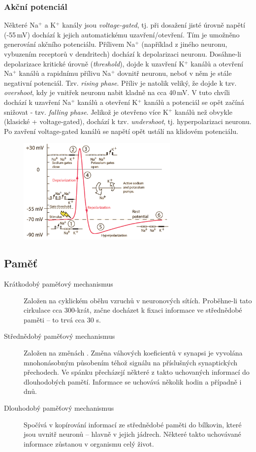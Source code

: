 \documentclass[11pt]{report} %
\numberwithin{equation}{section}
\begin{document}
\subsubsection{Akční potenciál}
Některé Na$^+$ a K$^+$ kanály jsou \textit{voltage-gated}, tj. při dosažení jisté úrovně napětí (-55\,mV) dochází k jejich automatickému uzavření/otevření. Tím je umožněno generování akčního potenciálu. Přílivem Na$^+$ (například z jiného neuronu, vybuzením receptorů v dendritech) dochází k depolarizaci neuronu. Dosáhne-li depolarizace kritické úrovně (\textit{threshold}), dojde k uzavření K$^+$ kanálů a otevření Na$^+$ kanálů a rapidnímu přílivu Na$^+$ dovnitř neuronu, neboť v něm je stále negativní potenciál. Tzv. \textit{rising phase}. Příliv je natolik veliký, že dojde k tzv. \textit{overshoot}, kdy je vnitřek neuronu nabit kladně na cca 40\,mV. V tuto chvíli dochází k uzavření Na$^+$ kanálů a otevření K$^+$ kanálů a potenciál se opět začíná snižovat - tzv. \textit{falling phase}. Jelikož je otevřeno více K$^+$ kanálů než obvykle (klasické + voltage-gated), dochází k tzv. \textit{undershoot}, tj. hyperpolarizaci neuronu. Po zavření voltage-gated kanálů se napětí opět ustálí na klidovém potenciálu.
\begin{figure}[H]
	\centering
	\includegraphics[width=0.7\textwidth]{img/action_potential.png}
\end{figure}

\subsection{Paměť}
\begin{description}
	
	
	\item[Krátkodobý paměťový mechanismus] Založen na cyklickém oběhu vzruchů v neuronových sítích. Proběhne-li tato cirkulace cca 300-krát, začne docházet k fixaci informace ve střednědobé paměti – to trvá cca 30 s.
	\item[Střednědobý paměťový mechanismus] Založen na změnách . Změna váhových koeficientů v synapsi je vyvolána mnohonásobným působením téhož signálu na příslušných synaptických přechodech. Ve spánku přecházejí některé z takto uchovaných informací do dlouhodobých pamětí. Informace se uchovává několik hodin a případně i dnů.
	\item[Dlouhodobý paměťový mechanismus] Spočívá v kopírování informací ze střednědobé paměti do bílkovin, které jsou uvnitř neuronů – hlavně v jejich jádrech. Některé takto uchovávané informace zůstanou v organismu celý život.
\end{description}
\end{document}

